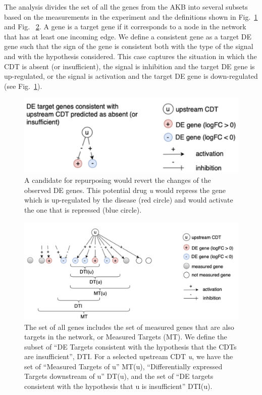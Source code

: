 The analysis divides the set of all the genes from the AKB into several subsets based on the measurements in the experiment and the definitions shown in Fig.~\ref{TwoHypotheses} and Fig. ~\ref{MeasuredGenes}. 
A gene is a target gene if it corresponds to a node in the network that has at least one incoming edge. We define a consistent gene as a target DE gene such that the sign of the gene is consistent both with the type of the signal and with the hypothesis considered. 
This case captures the situation in which the CDT is absent (or insufficient), the signal is inhibition and the target DE gene is up-regulated, or the signal is activation and the target DE gene is down-regulated (see Fig.~\ref{TwoHypotheses}).

\begin{figure}
\centering
	\includegraphics[width=0.6\linewidth]{Figures/TwoHypotheses.png}
        \caption{A candidate for repurposing would revert the changes of the  observed DE genes. This potential drug \emph{u} would repress the  gene which is up-regulated by the disease (red circle) and would activate the one that is repressed (blue circle). }
        \label{TwoHypotheses}
\end{figure}

\begin{figure}
	\includegraphics[width=0.9\linewidth]{Figures/MeasuredGenes.png}
        \caption{The set of all genes includes the set of measured genes that are also targets in the network, or Measured Targets (MT). We define the subset of ``DE Targets consistent with the hypothesis that the CDTs are  insufficient'', DTI. For a selected upstream CDT \emph{u}, we have the set of ``Measured Targets of u'' MT(u), ``Differentially expressed Targets downstream of u'' DT(u), and the set of ``DE targets consistent with the hypothesis that u is insufficient'' DTI(u).}
        \label{MeasuredGenes}
\end{figure}

